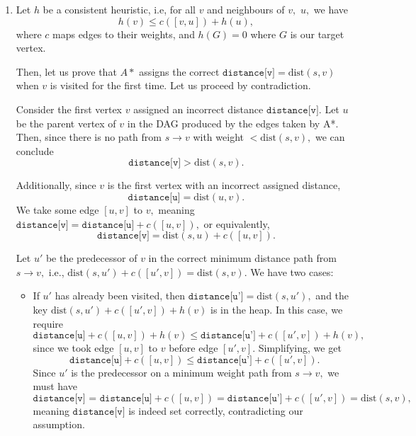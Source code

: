 \documentclass[12pt]{article}
\begin{document}
\begin{enumerate}
  \item Let $h$ be a consistent heuristic, i.e, for all $v$ and
    neighbours of $v,$ $u,$ we have
    $$
    h(v) \leq c([v, u]) + h(u),
    $$
    where $c$ maps edges to their weights, and $h(G) = 0$ where $G$
    is our target vertex.

    Then, let us prove that $A*$ assigns the correct
    $\texttt{distance[v]} = \text{dist}(s, v)$ when $v$ is visited
    for the first time. Let us proceed by contradiction.

    Consider the first vertex $v$ assigned an incorrect distance
    $\texttt{distance[v]}.$ Let $u$ be the parent vertex of $v$ in
    the DAG produced by the edges taken by A*. Then, since there is
    no path from $s \to v$ with weight $< \text{dist}(s, v),$ we can conclude $$
    \texttt{distance[v]} > \text{dist}(s, v).
    $$

    Additionally, since $v$ is the first vertex with an incorrect
    assigned distance,
    $$
    \texttt{distance[u]} = \text{dist}(u, v).
    $$
    We take some edge $[u, v]$ to $v,$ meaning $\texttt{distance[v]}
    = \texttt{distance[u]} + c([u, v]),$ or equivalently,
    $$
    \texttt{distance[v]} = \text{dist}(s, u) + c([u, v]).
    $$

    Let $u'$ be the predecessor of $v$ in the correct minimum
    distance path from $s \to v,$ i.e., $\text{dist}(s, u') + c([u',
    v]) = \text{dist}(s, v).$ We have two cases:
    \begin{itemize}
      \item If $u'$ has already been visited, then
        $\texttt{distance[u']} = \text{dist}(s, u'),$ and the key
        $\text{dist}(s, u') + c([u', v]) + h(v)$ is in the heap. In
        this case, we require
        $$
        \texttt{distance[u]} + c([u, v]) + h(v) \leq
        \texttt{distance[u']} + c([u', v]) + h(v),
        $$
        since we took edge $[u, v]$ to $v$ before edge $[u', v].$
        Simplifying, we get
        $$
        \texttt{distance[u]} + c([u, v]) \leq \texttt{distance[u']} +
        c([u', v]).
        $$
        Since $u'$ is the predecessor on a minimum weight path from
        $s \to v,$ we must have
        $$
        \texttt{distance[v] = }\texttt{distance[u]} + c([u, v]) =
        \texttt{distance[u']} + c([u', v]) = \text{dist}(s, v),
        $$
        meaning $\texttt{distance[v]}$ is indeed set correctly,
        contradicting our assumption.


\end{itemize}
\end{enumerate}
\end{document}
